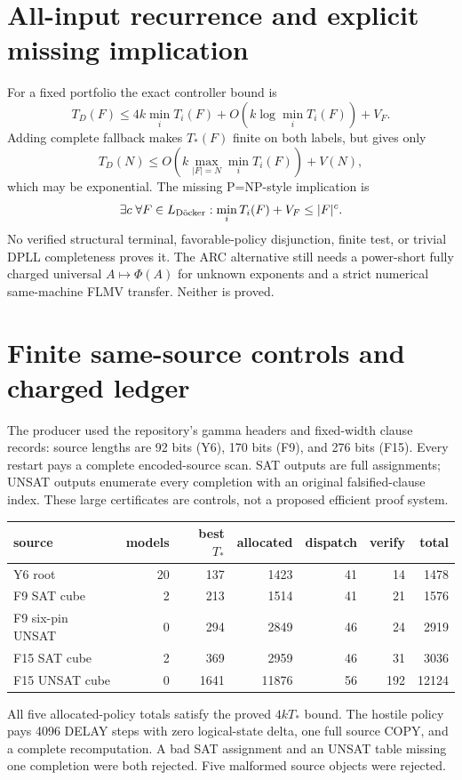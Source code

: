 \documentclass[11pt]{article}
\begin{document}
\section{All-input recurrence and explicit missing implication}
For a fixed portfolio the exact controller bound is
\[
 T_D(F)\le 4k\min_iT_i(F)+O(k\log\min_iT_i(F))+V_F.
\]
Adding complete fallback makes $T_*(F)$ finite on both labels, but gives only
\[
T_D(N)\le O\!\left(k\max_{|F|=N}\min_iT_i(F)\right)+V(N),
\]
which may be exponential.  The missing P=NP-style implication is
\[
 \exists c\;\forall F\in L_{\rm D\ddot{o}cker}:
 \min_iT_i(F)+V_F\le |F|^c.
\]
No verified structural terminal, favorable-policy disjunction, finite test,
or trivial DPLL completeness proves it.  The ARC alternative still needs a
power-short fully charged universal $A\mapsto\Phi(A)$ for unknown exponents
and a strict numerical same-machine FLMV transfer.  Neither is proved.

\section{Finite same-source controls and charged ledger}
The producer used the repository's gamma headers and fixed-width clause
records: source lengths are 92 bits (Y6), 170 bits (F9), and 276 bits (F15).
Every restart pays a complete encoded-source scan.  SAT outputs are full
assignments; UNSAT outputs enumerate every completion with an original
falsified-clause index.  These large certificates are controls, not a proposed
efficient proof system.
\begin{center}\small
\begin{tabular}{lrrrrrr}
\toprule source&models&best $T_*$&allocated&dispatch&verify&total\\\midrule
Y6 root&20&137&1423&41&14&1478\\
F9 SAT cube&2&213&1514&41&21&1576\\
F9 six-pin UNSAT&0&294&2849&46&24&2919\\
F15 SAT cube&2&369&2959&46&31&3036\\
F15 UNSAT cube&0&1641&11876&56&192&12124\\\bottomrule
\end{tabular}
\end{center}
All five allocated-policy totals satisfy the proved $4kT_*$ bound.  The
hostile policy pays 4096 DELAY steps with zero logical-state delta, one full
source COPY, and a complete recomputation.  A bad SAT assignment and an
UNSAT table missing one completion were both rejected.  Five malformed source
objects were rejected.
\end{document}
